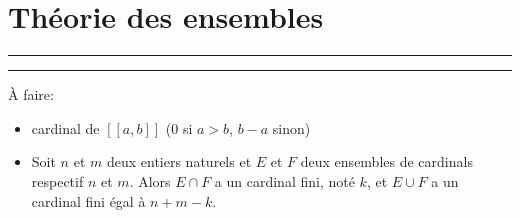 \section{Théorie des ensembles}















\bigskip

\hrule
\hrule

\medskip

\noindent À faire:
\begin{itemize}
    \item cardinal de $[\![a,b]\!]$ ($0$ si $a > b$, $b-a$ sinon)
    \item Soit $n$ et $m$ deux entiers naturels et $E$ et $F$ deux ensembles de cardinals respectif $n$ et $m$. Alors $E \cap F$ a un cardinal fini, noté $k$, et $E \cup F$ a un cardinal fini égal à $n+m-k$.
\end{itemize}
